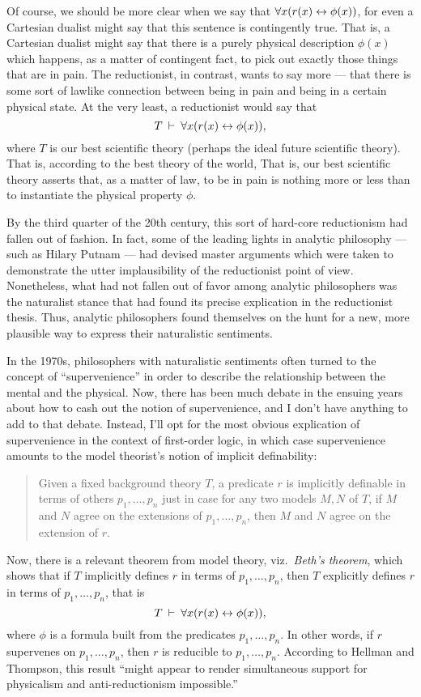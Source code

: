 Of course, we should be more clear when we say that
$\forall x(r(x)\leftrightarrow \phi (x))$, for even a Cartesian dualist might say
that this sentence is contingently true.  That is, a Cartesian dualist
might say that there is a purely physical description $\phi (x)$ which
happens, as a matter of contingent fact, to pick out exactly those
things that are in pain.  The reductionist, in contrast, wants to say
more --- that there is some sort of lawlike connection between being
in pain and being in a certain physical state.  At the very least, a
reductionist would say that
\[ T\: \vdash \: \forall x(r(x)\leftrightarrow \phi (x)) ,\] where $T$ is our
best scientific theory (perhaps the ideal future scientific theory).
That is, according to the best theory of the world, That is, our best
scientific theory asserts that, as a matter of law, to be in pain is
nothing more or less than to instantiate the physical property $\phi$.

By the third quarter of the 20th century, this sort of hard-core
reductionism had fallen out of fashion.  In fact, some of the leading
lights in analytic philosophy --- such as Hilary Putnam --- had
devised master arguments which were taken to demonstrate the utter
implausibility of the reductionist point of view.  Nonetheless, what
had not fallen out of favor among analytic philosophers was the
naturalist stance that had found its precise explication in the
reductionist thesis.  Thus, analytic philosophers found themselves on
the hunt for a new, more plausible way to express their naturalistic
sentiments.

In the 1970s, philosophers with naturalistic sentiments often turned
to the concept of ``supervenience'' in order to describe the
relationship between the mental and the physical.  Now, there has been
much debate in the ensuing years about how to cash out the notion of
supervenience, and I don't have anything to add to that debate.
Instead, I'll opt for the most obvious explication of supervenience in
the context of first-order logic, in which case supervenience amounts
to the model theorist's notion of implicit definability:
\begin{quote} Given a fixed background theory $T$, a predicate $r$ is
  implicitly definable in terms of others $p_1,\dots ,p_n$ just in
  case for any two models $M,N$ of $T$, if $M$ and $N$ agree on the
  extensions of $p_1,\dots ,p_n$, then $M$ and $N$ agree on the
  extension of $r$. \end{quote}
Now, there is a relevant theorem from model theory, viz.\ \emph{Beth's
  theorem}, which shows that if $T$ implicitly defines $r$ in terms of
$p_1,\dots ,p_n$, then $T$ explicitly defines $r$ in terms of
$p_1,\dots ,p_n$, that is
\[ T\:\vdash \: \forall x(r(x)\leftrightarrow \phi (x)) ,\] where $\phi$ is a
formula built from the predicates $p_1,\dots ,p_n$.  In other words,
if $r$ supervenes on $p_1,\dots ,p_n$, then $r$ is reducible to
$p_1,\dots ,p_n$.  According to Hellman and Thompson, this result
``might appear to render simultaneous support for physicalism and
anti-reductionism impossible.''

